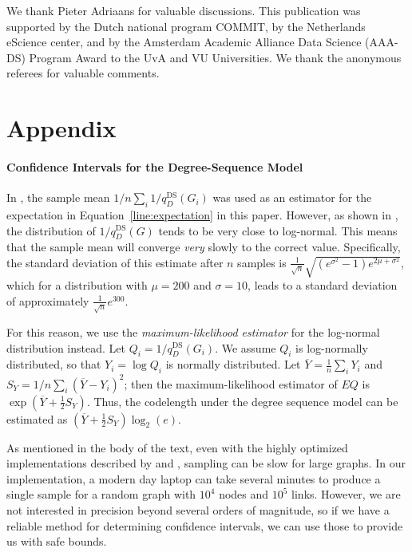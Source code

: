 \documentclass[twoside,11pt]{article}
\begin{document}
\acks We thank Pieter Adriaans for valuable discussions. This publication was supported by the Dutch national program COMMIT, by the Netherlands eScience center, and by the Amsterdam Academic Alliance Data Science (AAA-DS) Program Award to the UvA and VU Universities. We thank the anonymous referees for valuable comments.

\section{Appendix}

\label{section:appendix}
\paragraph{Confidence Intervals for the Degree-Sequence Model}
\label{section:confidence-intervals}


In \cite{blitzstein2011sequential}, the sample mean $1/n \sum_i 1/q^\text{DS}_D(G_i)$ was used as an estimator for the expectation in Equation~\ref{line:expectation} in this paper. However, as shown in \cite{charo2010efficient}, the distribution of $1/q^\text{DS}_D(G)$ tends to be very close to log-normal. This means that the sample mean will converge \emph{very} slowly to the correct value. Specifically, the standard deviation of this estimate after $n$ samples is $\frac{1}{\sqrt{n}} \sqrt{(e^{\sigma^2}-1)e^{2\mu +\sigma^2}}$, which for a distribution with $\mu=200$ and $\sigma=10$, leads to a standard deviation of approximately $\frac{1}{\sqrt{n}} e^{300}$.

For this reason, we use the \emph{maximum-likelihood estimator} for the log-normal distribution instead. Let $Q_i = 1/q^\text{DS}_{D}(G_i)$. We assume $Q_i$ is log-normally distributed, so that $Y_i = \log Q_i$ is normally distributed. Let $\overline{Y} = \frac{1}{n}\sum_i Y_i$ and $S_Y = 1/n \sum_i (\overline{Y} - Y_i)^2$; then the maximum-likelihood estimator of $EQ$ is $\exp\left(\overline{Y} + \frac{1}{2}S_Y\right)$. Thus, the codelength under the degree sequence model can be estimated as $\left(\overline{Y} + \frac{1}{2}S_Y\right)\log_2(e)$.

As mentioned in the body of the text, even with the highly optimized implementations described by \cite{charo2010efficient} and \cite{kim2012constructing}, sampling can be slow for large graphs. In our implementation, a modern day laptop can take several minutes to produce a single sample for a random graph with $10^4$ nodes and $10^5$ links. However, we are not interested in precision beyond several orders of magnitude, so if we have a reliable method for determining confidence intervals, we can use those to provide us with safe bounds.
\end{document}
